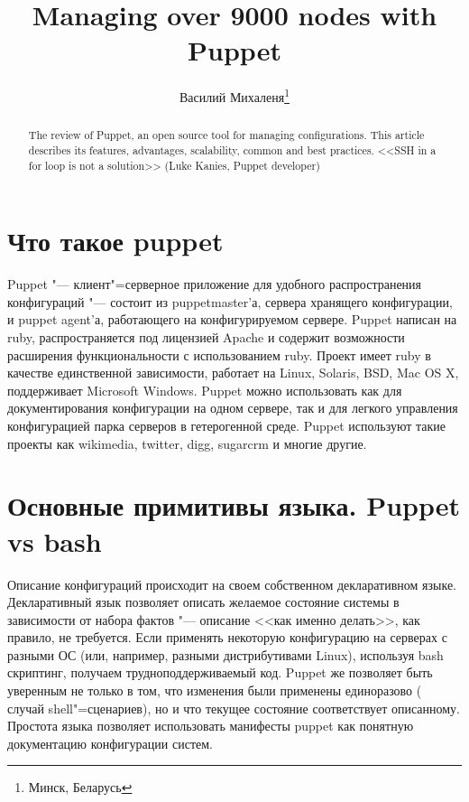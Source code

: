 \documentclass[10pt, a5paper]{article}
\begin{document}
\title{Managing over 9000 nodes with Puppet}%

\author{Василий Михаленя\footnote{Минск, Беларусь}}
\maketitle

\begin{abstract}
The review of Puppet, an open source tool for managing configurations. This article describes its features, advantages, scalability, common and best practices. <<SSH in a for loop is not a solution>> (Luke Kanies, Puppet developer)
\end{abstract}

\section*{Что такое puppet}

Puppet "--- клиент"=серверное приложение для удобного распространения конфигураций "--- состоит из puppetmaster'а, сервера хранящего конфигурации, и puppet agent'а, работающего на конфигурируемом сервере. Puppet написан на ruby, распространяется под лицензией Apache и содержит возможности расширения функциональности с использованием ruby. Проект имеет ruby в качестве единственной зависимости, работает на Linux, Solaris, BSD, Mac OS X, поддерживает Microsoft Windows. Puppet можно использовать как для документирования конфигурации на одном сервере, так и для легкого управления конфигурацией парка серверов в гетерогенной среде. Puppet используют такие проекты как wikimedia, twitter, digg, sugarcrm и многие другие.

\section*{Основные примитивы языка. Puppet vs bash}

Описание конфигураций происходит на своем собственном декларативном языке. Декларативный язык позволяет описать желаемое состояние системы в зависимости от набора фактов "--- описание <<как именно делать>>, как правило, не требуется. Если применять некоторую конфигурацию на серверах с разными ОС (или, например, разными дистрибутивами Linux), используя bash скриптинг, получаем трудноподдерживаемый код. Puppet же позволяет быть уверенным не только в том, что изменения были применены единоразово ( случай shell"=сценариев), но и что текущее состояние соответствует описанному. Простота языка позволяет использовать манифесты puppet как понятную документацию конфигурации систем.
\end{document}
